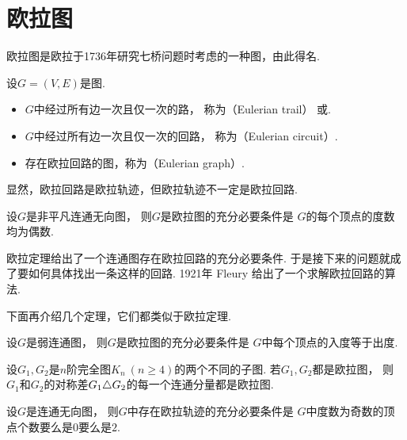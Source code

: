\section{欧拉图}
欧拉图是欧拉于1736年研究七桥问题时考虑的一种图，由此得名.
\begin{definition}
设\(G = (V,E)\)是图.
\begin{itemize}
	\item \(G\)中经过所有边一次且仅一次的路，
	称为（Eulerian trail）
	或.

	\item \(G\)中经过所有边一次且仅一次的回路，
	称为（Eulerian circuit）.

	\item 存在欧拉回路的图，称为（Eulerian graph）.
\end{itemize}
\end{definition}

显然，欧拉回路是欧拉轨迹，但欧拉轨迹不一定是欧拉回路.

\begin{theorem}[欧拉定理]
设\(G\)是非平凡连通无向图，
则\(G\)是欧拉图的充分必要条件是
\(G\)的每个顶点的度数均为偶数.
\end{theorem}

欧拉定理给出了一个连通图存在欧拉回路的充分必要条件.
于是接下来的问题就成了要如何具体找出一条这样的回路.
1921年 Fleury 给出了一个求解欧拉回路的算法.

下面再介绍几个定理，它们都类似于欧拉定理.
\begin{theorem}
设\(G\)是弱连通图，
则\(G\)是欧拉图的充分必要条件是
\(G\)中每个顶点的入度等于出度.
\end{theorem}

\begin{example}
设\(G_1,G_2\)是\(n\)阶完全图\(K_n\ (n\geq4)\)的两个不同的子图.
若\(G_1,G_2\)都是欧拉图，
则\(G_1\)和\(G_2\)的对称差\(G_1 \triangle G_2\)的每一个连通分量都是欧拉图.
\end{example}

\begin{corollary}
设\(G\)是连通无向图，
则\(G\)中存在欧拉轨迹的充分必要条件是
\(G\)中度数为奇数的顶点个数要么是\(0\)要么是\(2\).
\end{corollary}

